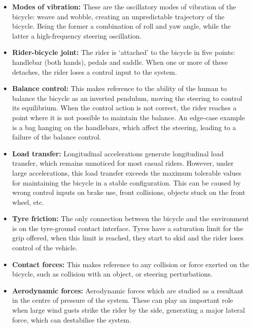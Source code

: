 \documentclass{article}
\begin{document}
\begin{itemize}
    \item \textbf{Modes of vibration:} These are the oscillatory modes of vibration of the bicycle: weave and wobble, creating an unpredictable trajectory of the bicycle.
        Being the former a combination of roll and yaw angle, while the latter a high-frequency steering oscillation.
    \item \textbf{Rider-bicycle joint:} The rider is `attached' to the bicycle in five points: handlebar (both hands), pedals and saddle.
        When one or more of these detaches, the rider loses a control input to the system.
    \item \textbf{Balance control:} This makes reference to the ability of the human to balance the bicycle as an inverted pendulum, moving the steering to control its equilibrium.
        When the control action is not correct, the rider reaches a point where it is not possible to maintain the balance.
        An edge-case example is a bag hanging on the handlebars, which affect the steering, leading to a failure of the balance control.
    \item \textbf{Load transfer:}  Longitudinal accelerations generate longitudinal load transfer, which remains unnoticed for most casual riders.
        However, under large accelerations, this load transfer exceeds the maximum tolerable values for maintaining the bicycle in a stable configuration.
        This can be caused by wrong control inputs on brake use, front collisions, objects stuck on the front wheel, etc.
    \item \textbf{Tyre friction:} The only connection between the bicycle and the environment is on the tyre-ground contact interface.
        Tyres have a saturation limit for the grip offered, when this limit is reached, they start to skid and the rider loses control of the vehicle.
    \item \textbf{Contact forces:}  This makes reference to any collision or force exerted on the bicycle, such as collision with an object, or steering perturbations.
    \item \textbf{Aerodynamic forces:} Aerodynamic forces which are studied as a resultant in the centre of pressure of the system.
        These can play an important role when large wind gusts strike the rider by the side, generating a major lateral force, which can destabilise the system.
\end{itemize}
\end{document}
